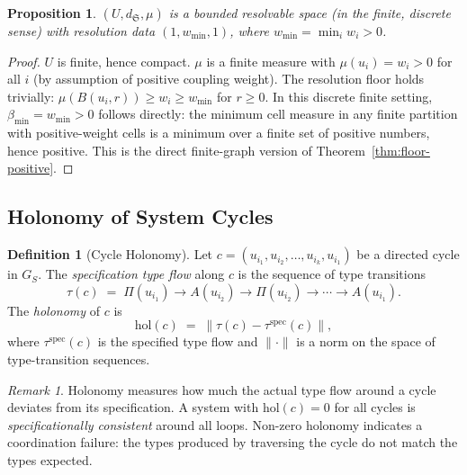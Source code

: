 \documentclass[12pt,a4paper,twocolumn]{article}
\theoremstyle{plain}
\newtheorem{proposition}[theorem]{Proposition}
\theoremstyle{definition}
\newtheorem{definition}[theorem]{Definition}
\theoremstyle{remark}
\newtheorem{remark}[theorem]{Remark}
\newcommand{\bmin}{\beta_{\min}}
\newcommand{\GS}{G_S}
\newcommand{\hol}{\mathrm{hol}}
\begin{document}
\begin{proposition}
$(U, d_\mathfrak{S}, \mu)$ is a bounded resolvable space (in the finite,
discrete sense) with resolution data $(1, w_{\min}, 1)$, where $w_{\min} =
\min_i w_i > 0$.
\end{proposition}

\begin{proof}
$U$ is finite, hence compact.  $\mu$ is a finite measure with $\mu(u_i) =
w_i > 0$ for all $i$ (by assumption of positive coupling weight).  The
resolution floor holds trivially: $\mu(B(u_i, r)) \geq w_i \geq w_{\min}$
for $r \geq 0$.  In this discrete finite setting, $\bmin = w_{\min} > 0$
follows directly: the minimum cell measure in any finite partition with
positive-weight cells is a minimum over a finite set of positive numbers,
hence positive.  This is the direct finite-graph version of
Theorem~\ref{thm:floor-positive}.
\end{proof}

\subsection{Holonomy of System Cycles}

\begin{definition}[Cycle Holonomy]
\label{def:holonomy}
Let $c = (u_{i_1}, u_{i_2}, \ldots, u_{i_k}, u_{i_1})$ be a directed cycle
in $\GS$.  The \emph{specification type flow} along $c$ is the sequence of
type transitions
\begin{equation}
  \tau(c) \;=\; \Pi(u_{i_1}) \to A(u_{i_2}) \to \Pi(u_{i_2}) \to \cdots
    \to A(u_{i_1}).
\end{equation}
The \emph{holonomy} of $c$ is
\begin{equation}
  \hol(c) \;=\; \left\| \tau(c) - \tau^{\mathrm{spec}}(c) \right\|,
\end{equation}
where $\tau^{\mathrm{spec}}(c)$ is the specified type flow and $\|\cdot\|$
is a norm on the space of type-transition sequences.
\end{definition}

\begin{remark}
Holonomy measures how much the actual type flow around a cycle deviates from
its specification.  A system with $\hol(c) = 0$ for all cycles is
\emph{specificationally consistent} around all loops.  Non-zero holonomy
indicates a coordination failure: the types produced by traversing the cycle
do not match the types expected.
\end{remark}
\end{document}
